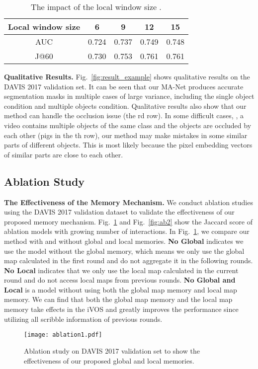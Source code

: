 \documentclass[10pt,twocolumn,letterpaper]{article}
\begin{document}
\begin{table}[t]
\centering
\small
\setlength{\tabcolsep}{4.9pt}
\begin{tabular}{c|c c c c}
\hline\hline
Local window size   & 6 &9 &12 &15\\ 
\hline
AUC & 0.724 & 0.737 & 0.749 & 0.748 \\ 
\hline
J@60 &0.730 & 0.753 & 0.761 & 0.761 \\
\hline 
\end{tabular}
\caption{The impact of the local window size .}
\vspace{-1em}
\label{table:localk}
\end{table}
\textbf{Qualitative Results.} 
Fig.~\ref{fig:result_example} shows qualitative results on the DAVIS 2017 validation set.  It can be seen that our MA-Net produces accurate segmentation masks in multiple cases of large variance, including the single object condition and multiple objects condition. Qualitative results also show that our method can handle the occlusion issue (the rd row). In some difficult cases, \eg, a video contains multiple objects of the same class and the objects are occluded by each other (pigs in the th row), our method may make mistakes in some similar parts of different objects. This is most likely because the pixel embedding vectors of similar parts are close to each other.

\subsection{Ablation Study}
\textbf{The Effectiveness of the Memory Mechanism. }
We conduct ablation studies using the DAVIS 2017 validation dataset to validate the effectiveness of our proposed memory mechanism. Fig.~\ref{fig:ab1} and Fig.~\ref{fig:ab2} show the Jaccard score of ablation models with growing number of interactions. In  Fig.~\ref{fig:ab1}, we compare our method with and without global and local memories. \textbf{No Global} indicates we use the model without the global memory, which means we only use the global map calculated in the first round and do not aggregate it in the following rounds. \textbf{No Local} indicates that we only use the local map calculated in the current round and do not access local maps from previous rounds. \textbf{No Global and Local} is a model without using both the global map memory and local map memory. We can find that both the global map memory and the local map memory take effects in the iVOS and greatly improves the performance since utilizing all scribble information of previous rounds. 
\begin{figure}[t]
\texttt{[image: ablation1.pdf]}
\centering
\caption{ Ablation study on DAVIS 2017 validation set to show the effectiveness of our proposed global and local memories.}
\vspace{-1.5em}
\label{fig:ab1}
\end{figure}
\end{document}
